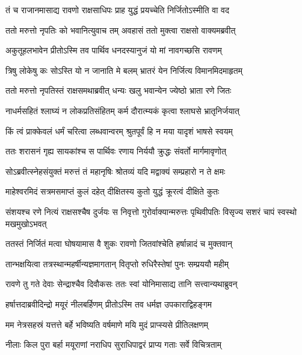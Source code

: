 \twolineshloka
{तं च राजानमासाद्य रावणो राक्षसाधिपः}
{प्राह युद्धं प्रयच्चेति निर्जितोऽस्मीति वा वद} %

\twolineshloka
{ततो मरुत्तो नृपतिः को भवानित्युवाच तम्}
{अवहासं ततो मुक्त्वा राक्षसो वाक्यमब्रवीत्} %

\twolineshloka
{अकुतूहलभावेन प्रीतोऽस्मि तव पार्थिव}
{धनदस्यानुजं यो मां नावगच्छसि रावणम्} %

\twolineshloka
{त्रिषु लोकेषु कः सोऽस्ति यो न जानाति मे बलम्}
{भ्रातरं येन निर्जित्य विमानमिदमाहृतम्} %

\twolineshloka
{ततो मरुत्तो नृपतिस्तं राक्षसमथाब्रवीत्}
{धन्यः खलु भवान्येन ज्येष्ठो भ्राता रणे जितः} %

\twolineshloka
{नाधर्मसहितं श्लाघ्यं न लोकप्रतिसंहितम्}
{कर्म दौरात्म्यकं कृत्वा श्लाघसे भ्रातृनिर्जयात्} %

\twolineshloka
{किं त्वं प्राक्केवलं धर्मं चरित्वा लब्धवान्वरम्}
{श्रुतपूर्वं हि न मया यादृशं भाषसे स्वयम्} %

\twolineshloka
{ततः शरासनं गृह्य सायकांश्च स पार्थिवः}
{रणाय निर्ययौ क्रुद्धः संवर्तो मार्गमावृणोत्} %

\twolineshloka
{सोऽब्रवीत्स्नेहसंयुक्तं मरुत्तं तं महानृषिः}
{श्रोतव्यं यदि मद्वाक्यं सम्प्रहारो न ते क्षमः} %

\twolineshloka
{माहेश्वरमिदं सत्रमसमाप्तं कुलं दहेत्}
{दीक्षितस्य कुतो युद्धं क्रूरत्वं दीक्षिते कुतः} %

\threelineshloka
{संशयश्च रणे नित्यं राक्षसश्चैष दुर्जयः}
{स निवृत्तो गुरोर्वाक्यान्मरुत्तः पृथिवीपतिः}
{विसृज्य सशरं चापं स्वस्थो मखमुखोऽभवत्} %

\twolineshloka
{ततस्तं निर्जितं मत्वा घोषयामास वै शुकः}
{रावणो जितवांश्चेति हर्षान्नादं च मुक्तवान्} %

\twolineshloka
{तान्भक्षयित्वा तत्रस्थान्महर्षीन्यज्ञमागतान्}
{वितृप्तो रुधिरैस्तेषां पुनः सम्प्रययौ महीम्} %

\twolineshloka
{रावणे तु गते देवाः सेन्द्राश्चैव दिवौकसः}
{ततः स्वां योनिमासाद्य तानि सत्त्वान्यथाब्रुवन्} %

\twolineshloka
{हर्षात्तदाब्रवीदिन्द्रो मयूरं नीलबर्हिणम्}
{प्रीतोऽस्मि तव धर्मज्ञ उपकाराद्विहङ्गम} %

\twolineshloka
{मम नेत्रसहस्रं यत्तत्ते बर्हे भविष्यति}
{वर्षमाणे मयि मुदं प्राप्स्यसे प्रीतिलक्षणम्} %

\twolineshloka
{नीलाः किल पुरा बर्हा मयूराणां नराधिप}
{सुराधिपाद्वरं प्राप्य गताः सर्वे विचित्रताम्} %

